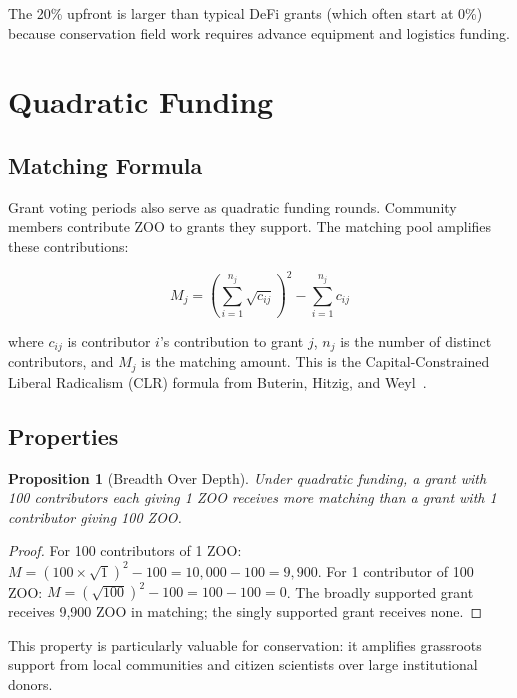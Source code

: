 \documentclass[11pt,letterpaper]{article}
\newtheorem{proposition}[theorem]{Proposition}
\begin{document}
The 20\% upfront is larger than typical DeFi grants (which often start at 0\%) because conservation field work requires advance equipment and logistics funding.

\section{Quadratic Funding}
\label{sec:qf}

\subsection{Matching Formula}

Grant voting periods also serve as quadratic funding rounds. Community members contribute ZOO to grants they support. The matching pool amplifies these contributions:

\begin{equation}
    M_j = \left(\sum_{i=1}^{n_j} \sqrt{c_{ij}}\right)^2 - \sum_{i=1}^{n_j} c_{ij}
\label{eq:qf}
\end{equation}

where $c_{ij}$ is contributor $i$'s contribution to grant $j$, $n_j$ is the number of distinct contributors, and $M_j$ is the matching amount. This is the Capital-Constrained Liberal Radicalism (CLR) formula from Buterin, Hitzig, and Weyl~\cite{buterin2019flexible}.

\subsection{Properties}

\begin{proposition}[Breadth Over Depth]
Under quadratic funding, a grant with 100 contributors each giving 1 ZOO receives more matching than a grant with 1 contributor giving 100 ZOO.
\end{proposition}

\begin{proof}
For 100 contributors of 1 ZOO: $M = (100 \times \sqrt{1})^2 - 100 = 10{,}000 - 100 = 9{,}900$. For 1 contributor of 100 ZOO: $M = (\sqrt{100})^2 - 100 = 100 - 100 = 0$. The broadly supported grant receives 9{,}900 ZOO in matching; the singly supported grant receives none.
\end{proof}

This property is particularly valuable for conservation: it amplifies grassroots support from local communities and citizen scientists over large institutional donors.
\end{document}
